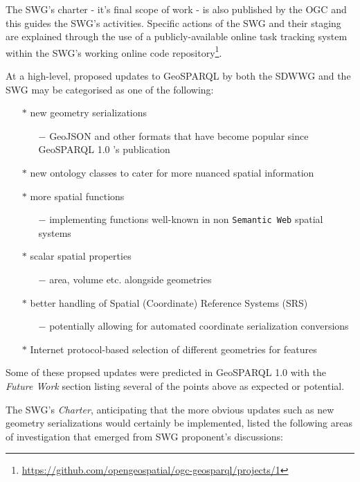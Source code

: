 \documentclass[runningheads]{llncs}
\begin{document}
The SWG's charter - it's final scope of work - is also published by the OGC \cite{abhayaratna2020ogc} and this guides 
the SWG's activities. Specific actions of the SWG and their staging are explained through the use of a publicly-available 
online task tracking system within the SWG's working online code repository\footnote{\url{https://github.com/opengeospatial/ogc-geosparql/projects/1}}.

At a high-level, proposed updates to GeoSPARQL by both the SDWWG and the SWG may be categorised as one of the following:

\begin{itemize}
    \item[$\ast$] new geometry serializations
    \begin{itemize}
        \item[$-$] GeoJSON and other formats that have become popular since GeoSPARQL 1.0 's publication
    \end{itemize} 
    \item[$\ast$] new ontology classes to cater for more nuanced spatial information
    \item[$\ast$] more spatial functions
    \begin{itemize}
        \item[$-$] implementing functions well-known in non \texttt{Semantic Web} spatial systems
    \end{itemize} 
    \item[$\ast$] scalar spatial properties 
    \begin{itemize}
        \item[$-$] area, volume etc. alongside geometries
    \end{itemize} 
    \item[$\ast$] better handling of Spatial (Coordinate) Reference Systems (SRS)
    \begin{itemize}
        \item[$-$] potentially allowing for automated coordinate serialization conversions
    \end{itemize} 
    \item[$\ast$] Internet protocol-based selection of different geometries for features
\end{itemize}

Some of these propsed updates were predicted in GeoSPARQL 1.0 with the \textit{Future Work} section listing several of the 
points above as expected or potential.

The SWG's \textit{Charter}, anticipating that the more obvious updates such as new geometry serializations would certainly
be implemented, listed the following areas of investigation that emerged from SWG proponent's discussions:
\end{document}
